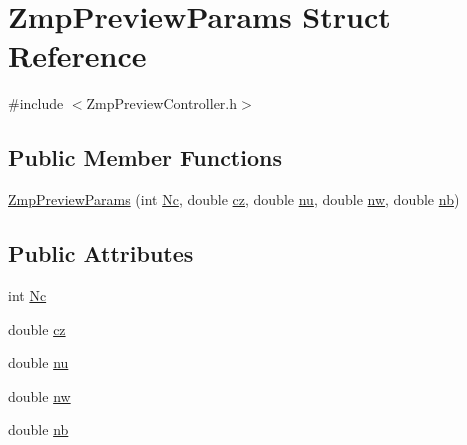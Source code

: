 \hypertarget{structZmpPreviewParams}{\section{\-Zmp\-Preview\-Params \-Struct \-Reference}
\label{structZmpPreviewParams}
}


{\ttfamily \#include $<$\-Zmp\-Preview\-Controller.\-h$>$}

\subsection*{\-Public \-Member \-Functions}
\begin{DoxyCompactItemize}
\item 
\hyperlink{structZmpPreviewParams_a67df1929d83bddb9fb44c9c7846762c6}{\-Zmp\-Preview\-Params} (int \hyperlink{structZmpPreviewParams_adf022d12c133e9a17a41c1a9864fdef0}{\-Nc}, double \hyperlink{structZmpPreviewParams_a4bddbdd99f911c9dddfcb2445da1b7dc}{cz}, double \hyperlink{structZmpPreviewParams_a3be5d92df5593e2a7c5694beaf912dac}{nu}, double \hyperlink{structZmpPreviewParams_ae09ca5b74feda7b0af99c07cd7a36c64}{nw}, double \hyperlink{structZmpPreviewParams_abaa39df27b9d8993a940e753b297dcea}{nb})
\end{DoxyCompactItemize}
\subsection*{\-Public \-Attributes}
\begin{DoxyCompactItemize}
\item 
int \hyperlink{structZmpPreviewParams_adf022d12c133e9a17a41c1a9864fdef0}{\-Nc}
\item 
double \hyperlink{structZmpPreviewParams_a4bddbdd99f911c9dddfcb2445da1b7dc}{cz}
\item 
double \hyperlink{structZmpPreviewParams_a3be5d92df5593e2a7c5694beaf912dac}{nu}
\item 
double \hyperlink{structZmpPreviewParams_ae09ca5b74feda7b0af99c07cd7a36c64}{nw}
\item 
double \hyperlink{structZmpPreviewParams_abaa39df27b9d8993a940e753b297dcea}{nb}
\end{DoxyCompactItemize}


